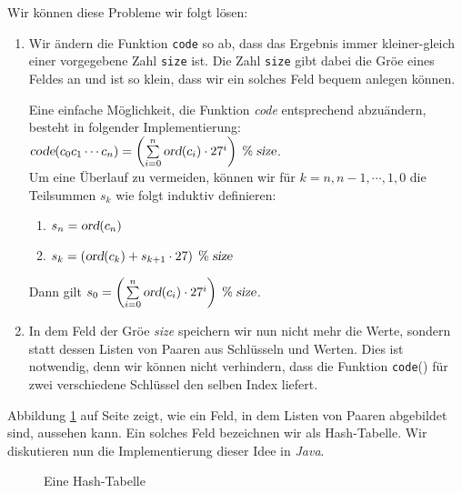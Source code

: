 Wir k\"onnen diese Probleme wir folgt l\"osen:
\begin{enumerate}
\item Wir \"andern die Funktion \texttt{code} so ab, dass das Ergebnis
      immer kleiner-gleich einer vorgegebene Zahl \texttt{size} ist.  Die Zahl
      \texttt{size} gibt dabei die Gr\"o\3e eines Feldes an und ist so klein,
      dass wir ein solches Feld bequem anlegen k\"onnen.

      Eine einfache M\"oglichkeit, die Funktion \textsl{code} entsprechend abzu\"andern,
      besteht in folgender Implementierung: \\[0.2cm]
      \hspace*{1.3cm} 
      $\textsl{code}(c_0c_1\cdots c_n) = \left(\sum\limits_{i=0}^n \textsl{ord}(c_i) \cdot 27^i\right) \;\%\; \textsl{size}$.
      \\[0.2cm]
      Um eine \"Uberlauf zu vermeiden, k\"onnen wir f\"ur $k=n,n-1,\cdots,1,0$ die Teilsummen $s_k$
      wie folgt induktiv definieren:
      \begin{enumerate}
      \item $s_n = \textsl{ord}(c_n)$
      \item $s_{k} = \left(\textsl{ord}(c_{k}) + s_{k+1} \cdot 27 \right) \;\%\; \textsl{size}$
      \end{enumerate}
      Dann gilt
      \hspace*{1.3cm} 
      $s_0 = \left(\sum\limits_{i=0}^n \textsl{ord}(c_i) \cdot 27^i\right) \;\%\; \textsl{size}$.
      
\item In dem Feld der Gr\"o\3e \textsl{size} speichern wir nun nicht mehr die Werte, sondern statt dessen
      Listen von Paaren aus Schl\"usseln und Werten.  Dies ist notwendig, denn wir k\"onnen
      nicht verhindern, dass die Funktion \texttt{code}() f\"ur zwei verschiedene
      Schl\"ussel den selben Index liefert.
\end{enumerate}
Abbildung \ref{fig:hash-example} auf Seite \pageref{fig:hash-example} zeigt, wie ein Feld,
in dem Listen von Paaren abgebildet sind, aussehen kann.  Ein solches Feld bezeichnen wir
als Hash-Tabelle.  Wir diskutieren nun die Implementierung dieser Idee in \textsl{Java}.


\begin{figure}[!ht]
  \centering
  \caption{Eine Hash-Tabelle}
  \label{fig:hash-example}
\end{figure}


